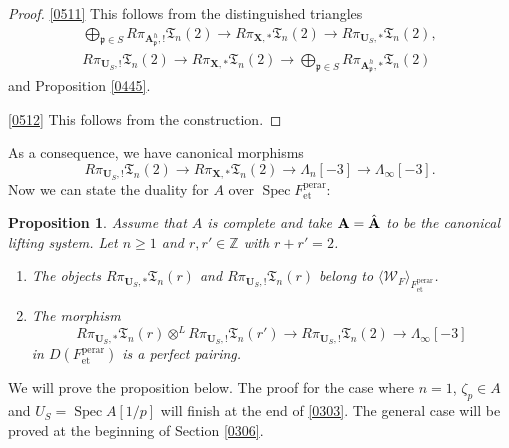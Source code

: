 \documentclass{amsart}
\newtheorem{Prop}[Thm]{Proposition}
\theoremstyle{remark}
\numberwithin{equation}{subsection}
\newcommand{\tensor}{\mathbin{\otimes}}
\newcommand{\Z}{\mathbb{Z}}
\newcommand{\et}{\mathrm{et}}
\newcommand{\perar}{\mathrm{perar}}
\newcommand{\alg}[1]{\mathbf{#1}}
\newcommand{\ideal}[1]{\mathfrak{#1}}
\newcommand{\genby}[1]{\langle #1 \rangle}
\DeclareMathOperator{\Spec}{Spec}
\begin{document}
\begin{proof}
	\eqref{0511}
	This follows from the distinguished triangles
		\begin{gather*}
					\bigoplus_{\ideal{p} \in S}
						R \pi_{\alg{A}_{\ideal{p}}^{h}, !} \mathfrak{T}_{n}(2)
				\to
					R \pi_{\alg{X}, \ast} \mathfrak{T}_{n}(2)
				\to
					R \pi_{\alg{U}_{S}, \ast} \mathfrak{T}_{n}(2),
			\\
					R \pi_{\alg{U}_{S}, !} \mathfrak{T}_{n}(2)
				\to
					R \pi_{\alg{X}, \ast} \mathfrak{T}_{n}(2)
				\to
					\bigoplus_{\ideal{p} \in S}
						R \pi_{\alg{A}_{\ideal{p}}^{h}, \ast} \mathfrak{T}_{n}(2)
		\end{gather*}
	and Proposition \ref{0445}.
	
	\eqref{0512}
	This follows from the construction.
\end{proof}

As a consequence, we have canonical morphisms
	\begin{equation} \label{0418}
			R \pi_{\alg{U}_{S}, !} \mathfrak{T}_{n}(2)
		\to
			R \pi_{\alg{X}, \ast} \mathfrak{T}_{n}(2)
		\to
			\Lambda_{n}[-3]
		\to
			\Lambda_{\infty}[-3].
	\end{equation}
Now we can state the duality for $A$ over $\Spec F^{\perar}_{\et}$:

\begin{Prop} \label{0112}
	Assume that $A$ is complete and
	take $\alg{A} = \Hat{\alg{A}}$ to be the canonical lifting system.
	Let $n \ge 1$ and $r, r' \in \Z$ with $r + r' = 2$.
	\begin{enumerate}
		\item \label{0286}
			The objects $R \pi_{\alg{U}_{S}, \ast} \mathfrak{T}_{n}(r)$ and
			$R \pi_{\alg{U}_{S}, !} \mathfrak{T}_{n}(r)$
			belong to $\genby{\mathcal{W}_{F}}_{F^{\perar}_{\et}}$.
		\item \label{0287}
			The morphism
				\[
							R \pi_{\alg{U}_{S}, \ast} \mathfrak{T}_{n}(r)
						\tensor^{L}
							R \pi_{\alg{U}_{S}, !} \mathfrak{T}_{n}(r')
					\to
						R \pi_{\alg{U}_{S}, !} \mathfrak{T}_{n}(2)
					\to
						\Lambda_{\infty}[-3]
				\]
			in $D(F^{\perar}_{\et})$ is a perfect pairing.
	\end{enumerate}
\end{Prop}

We will prove the proposition below.
The proof for the case where $n = 1$, $\zeta_{p} \in A$ and $U_{S} = \Spec A[1 / p]$ will finish
at the end of \ref{0303}.
The general case will be proved at the beginning of Section \ref{0306}.
\end{document}
